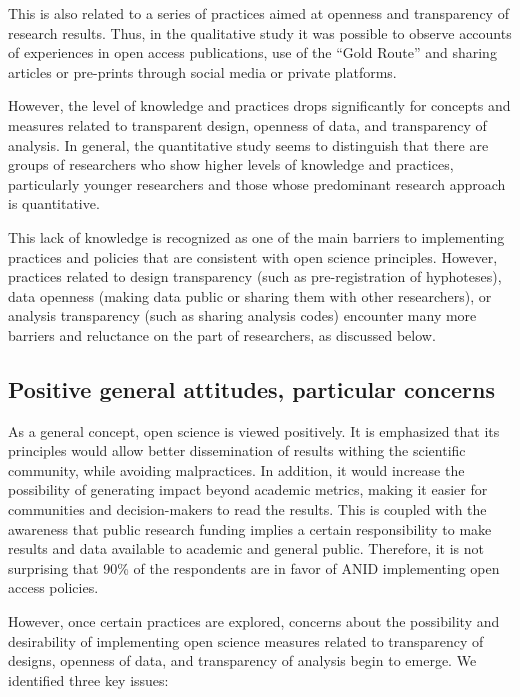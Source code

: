 \documentclass[
  letterpaper,
]{article}
\begin{document}
This is also related to a series of practices aimed at openness and
transparency of research results. Thus, in the qualitative study it was
possible to observe accounts of experiences in open access publications,
use of the ``Gold Route'' and sharing articles or pre-prints through
social media or private platforms.

However, the level of knowledge and practices drops significantly for
concepts and measures related to transparent design, openness of data,
and transparency of analysis. In general, the quantitative study seems
to distinguish that there are groups of researchers who show higher
levels of knowledge and practices, particularly younger researchers and
those whose predominant research approach is quantitative.

This lack of knowledge is recognized as one of the main barriers to
implementing practices and policies that are consistent with open
science principles. However, practices related to design transparency
(such as pre-registration of hyphoteses), data openness (making data
public or sharing them with other researchers), or analysis transparency
(such as sharing analysis codes) encounter many more barriers and
reluctance on the part of researchers, as discussed below.

\subsection{Positive general attitudes, particular
concerns}\label{positive-general-attitudes-particular-concerns}

As a general concept, open science is viewed positively. It is
emphasized that its principles would allow better dissemination of
results withing the scientific community, while avoiding malpractices.
In addition, it would increase the possibility of generating impact
beyond academic metrics, making it easier for communities and
decision-makers to read the results. This is coupled with the awareness
that public research funding implies a certain responsibility to make
results and data available to academic and general public. Therefore, it
is not surprising that 90\% of the respondents are in favor of ANID
implementing open access policies.

However, once certain practices are explored, concerns about the
possibility and desirability of implementing open science measures
related to transparency of designs, openness of data, and transparency
of analysis begin to emerge. We identified three key issues:
\end{document}
